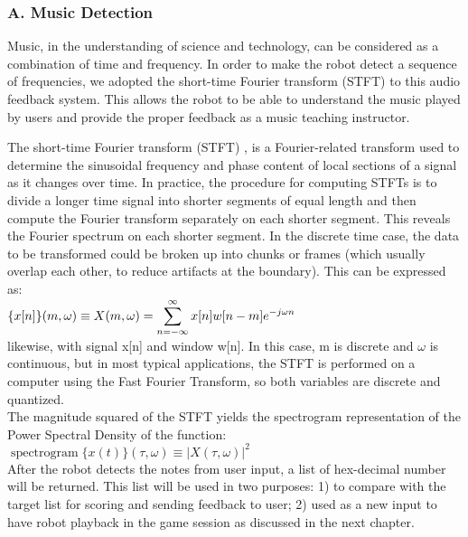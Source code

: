 \documentclass[conference]{IEEEtran}
\begin{document}
\subsubsection{A. Music Detection}
Music, in the understanding of science and technology, can be considered as a combination 
of time and frequency. In order to make the robot detect a sequence of frequencies, we adopted the 
short-time Fourier transform (STFT) to this audio feedback system. This allows the robot to 
be able to understand the music played by users and provide the proper feedback as
a music teaching instructor.

The short-time Fourier transform (STFT) , is a Fourier-related transform used to 
determine the sinusoidal frequency and phase content of local sections of a signal 
as it changes over time. In practice, the procedure for computing STFTs is to divide 
a longer time signal into shorter segments of equal length and then compute the 
Fourier transform separately on each shorter segment. This reveals the Fourier 
spectrum on each shorter segment. In the discrete time case, the data to be transformed could 
be broken up into chunks or frames (which usually overlap each other, to reduce 
artifacts at the boundary). This can be expressed as:
\\

${\displaystyle \mathbf\{x[n]\}(m,\omega )\equiv X(m,\omega )=\sum _{n=-\infty }^{\infty }x[n]w[n-m]e^{-j\omega n}}$
\\

likewise, with signal x[n] and window w[n]. In this case, m is discrete and $\omega$ 
is continuous, but in most typical applications, the STFT is performed on a computer 
using the Fast Fourier Transform, so both variables are discrete and quantized.\\
The magnitude squared of the STFT yields the spectrogram representation of the Power 
Spectral Density of the function:
\\

${\displaystyle \operatorname {spectrogram} \{x(t)\}(\tau ,\omega )\equiv |X(\tau ,\omega )|^{2}}$\\

After the robot detects the notes from user input, a list of hex-decimal number will be
returned. This list will be used in two purposes: 1) to compare with the target list
for scoring and sending feedback to user; 2) used as a new input to have
robot playback in the game session as discussed in the next chapter.\\
\end{document}
